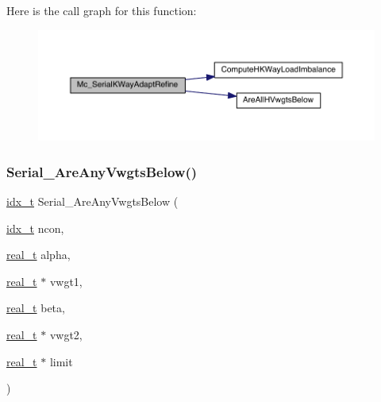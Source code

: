Here is the call graph for this function\+:\nopagebreak
\begin{figure}[H]
\begin{center}
\leavevmode
\includegraphics[width=350pt]{a00407_a8aad6fc44513e8a6ff7e151c231f98ce_cgraph}
\end{center}
\end{figure}
\mbox{\label{a00407_ad0ed41db7a15698760c73a84b9eb64fc}} 
\subsubsection{\texorpdfstring{Serial\+\_\+\+Are\+Any\+Vwgts\+Below()}{Serial\_AreAnyVwgtsBelow()}}
{\footnotesize\ttfamily \hyperlink{a00876_aaa5262be3e700770163401acb0150f52}{idx\+\_\+t} Serial\+\_\+\+Are\+Any\+Vwgts\+Below (\begin{DoxyParamCaption}\item[{\hyperlink{a00876_aaa5262be3e700770163401acb0150f52}{idx\+\_\+t}}]{ncon,  }\item[{\hyperlink{a00876_a1924a4f6907cc3833213aba1f07fcbe9}{real\+\_\+t}}]{alpha,  }\item[{\hyperlink{a00876_a1924a4f6907cc3833213aba1f07fcbe9}{real\+\_\+t} $\ast$}]{vwgt1,  }\item[{\hyperlink{a00876_a1924a4f6907cc3833213aba1f07fcbe9}{real\+\_\+t}}]{beta,  }\item[{\hyperlink{a00876_a1924a4f6907cc3833213aba1f07fcbe9}{real\+\_\+t} $\ast$}]{vwgt2,  }\item[{\hyperlink{a00876_a1924a4f6907cc3833213aba1f07fcbe9}{real\+\_\+t} $\ast$}]{limit }\end{DoxyParamCaption})}

